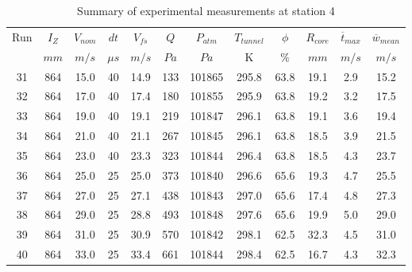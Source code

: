 \begin{table}[H]
\begin{center}
\begin{tabular}{|cccccccccccc|}
	\hline
	Run & $I_Z$ & $V_{nom}$ & $dt$ & $V_{fs}$ & $Q$ & $P_{atm}$ & $T_{tunnel}$ & $\phi$ & $R_{core}$ & $\overline{t}_{max}$ & $\overline{w}_{mean}$\\
	  & $mm$ & $m/s$ & $\mu s$ & $m/s$ & $Pa$ & $Pa$ & K & $\%$ & $mm$ & $m/s$ & $m/s$\\
	\hline
	31 & 864 & 15.0 & 40 & 14.9 & 133 & 101865 & 295.8 & 63.8 & 19.1 & 2.9 & 15.2\\
	32 & 864 & 17.0 & 40 & 17.4 & 180 & 101855 & 295.9 & 63.8 & 19.2 & 3.2 & 17.5\\
	33 & 864 & 19.0 & 40 & 19.1 & 219 & 101847 & 296.1 & 63.8 & 19.1 & 3.6 & 19.4\\
	34 & 864 & 21.0 & 40 & 21.1 & 267 & 101845 & 296.1 & 63.8 & 18.5 & 3.9 & 21.5\\
	35 & 864 & 23.0 & 40 & 23.3 & 323 & 101844 & 296.4 & 63.8 & 18.5 & 4.3 & 23.7\\
	36 & 864 & 25.0 & 25 & 25.0 & 373 & 101840 & 296.6 & 65.6 & 19.3 & 4.7 & 25.5\\
	37 & 864 & 27.0 & 25 & 27.1 & 438 & 101843 & 297.0 & 65.6 & 17.4 & 4.8 & 27.3\\
	38 & 864 & 29.0 & 25 & 28.8 & 493 & 101848 & 297.6 & 65.6 & 19.9 & 5.0 & 29.0\\
	39 & 864 & 31.0 & 25 & 30.9 & 570 & 101842 & 298.1 & 62.5 & 32.3 & 4.5 & 31.0\\
	40 & 864 & 33.0 & 25 & 33.4 & 661 & 101844 & 298.4 & 62.5 & 16.7 & 4.3 & 32.3\\
	\hline
\end{tabular}
\caption{Summary of experimental measurements at station 4}
\label{table:experiment_results_4}
\end{center}
\end{table}
